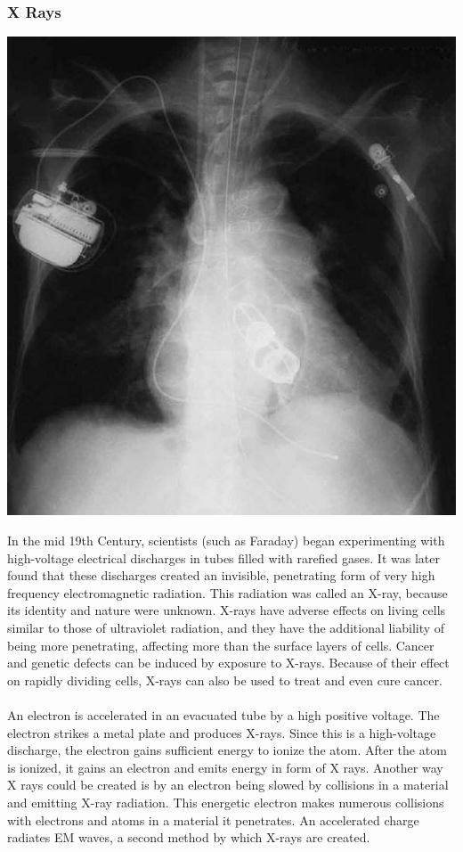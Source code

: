 \documentclass[11pt]{article}
\begin{document}
\subsubsection*{X Rays}
\begin{center}
	\includegraphics[scale=0.2]{x}
\end{center}
In the mid 19th Century, scientists (such as Faraday) began experimenting with high-voltage electrical discharges in tubes filled with rarefied gases. It was later found that these discharges created an invisible, penetrating form of very high frequency electromagnetic radiation. This radiation was called an X-ray, because its identity and nature were unknown. X-rays have adverse effects on living cells similar to those of ultraviolet radiation, and they have the additional liability of being more penetrating, affecting more than the surface layers of cells. Cancer and genetic defects can be induced by exposure to X-rays. Because of their effect on rapidly dividing cells, X-rays can also be used to treat and even cure cancer. \\ \\
An electron is accelerated in an evacuated tube by a high positive voltage. The electron strikes a metal plate and produces X-rays. Since this is a high-voltage discharge, the electron gains sufficient energy to ionize the atom. After the atom is ionized, it gains an electron and emits energy in form of X rays. Another way X rays could be created is by an electron being slowed by collisions in a material and emitting X-ray radiation. This energetic electron makes numerous collisions with electrons and atoms in a material it penetrates. An accelerated charge radiates EM waves, a second method by which X-rays are created.
\end{document}
